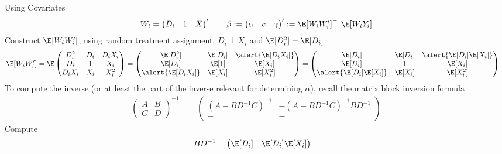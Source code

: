 \documentclass[aspectratio=169, handout]{beamer}
\begin{document}
{\scriptsize
\begin{frame}{Using Covariates}
\begin{align*}
  W_i =
  \begin{pmatrix}
    D_i &
    1 &
    X
  \end{pmatrix}'
  \qquad
  \beta
  :=
  \begin{pmatrix}
    \alpha &
    c &
    \gamma
  \end{pmatrix}'
  :=
  \E[W_iW_i']^{-1}
  \E[W_iY_i]
\end{align*}
Construct $\E[W_iW_i']$, using random treatment assignment, $D_i\perp
X_i$ and $\E[D_i^2]=\E[D_i]$:
\pause
\begin{align*}
  \E[W_iW_i']
  &=
  \E
  \begin{pmatrix}
    D_i^2  & D_i & D_i X_i \\
    D_i   &  1   & X_i     \\
    D_iX_i & X_i & X_i^2
  \end{pmatrix}
  =
  \begin{pmatrix}
    \E[D_i^2 ] & \E[D_i] & \alert{\E[D_i X_i]} \\
    \E[D_i   ] & \E[1  ] & \E[X_i    ] \\
    \alert{\E[D_iX_i]} & \E[X_i] & \E[X_i^2]
  \end{pmatrix}
  =
  \begin{pmatrix}
    \E[D_i ]     & \E[D_i] & \alert{\E[D_i] \E[X_i]} \\
    \E[D_i   ]     & 1       & \E[X_i] \\
    \alert{\E[D_i]\E[X_i]} & \E[X_i] & \E[X_i^2]
  \end{pmatrix}
\end{align*}
\pause
To compute the inverse (or at least the part of the inverse relevant
for determining $\alpha$), recall the matrix block inversion formula
\begin{align*}
  \begin{pmatrix}
    A & B \\
    C & D
  \end{pmatrix}^{-1}
  &=
  \begin{pmatrix}
    (A-BD^{-1}C)^{-1}
    & - (A-BD^{-1}C)^{-1} BD^{-1}
    \\
    - & -
  \end{pmatrix}
\end{align*}
Compute
\begin{align*}
  BD^{-1}
  &=
  \begin{pmatrix}
    \E[D_i] & \E[D_i] \E[X_i]
  \end{pmatrix}

\end{align*}
\end{frame}}
\end{document}
